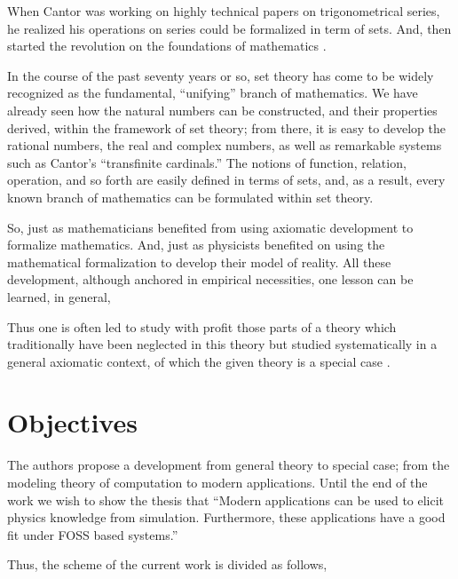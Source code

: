 \documentclass[
12pt,				%
openright,			%
oneside,			%
a4paper,			%
brazil,				%
english,			  %
]{abntex2}
\begin{document}
When Cantor was working on highly technical papers on trigonometrical
series, he realized his operations on series could be formalized in
term of sets. And, then started the revolution on the foundations of mathematics \cite{pinter2014book}.

\begin{citacao}
In the course of the past seventy years or so, set theory has come to be
widely recognized as the fundamental, “unifying” branch of mathematics. We
have already seen how the natural numbers can be constructed, and
their properties derived, within the framework of set theory; from
there, it is easy to develop the rational numbers, the real and
complex numbers, as well as remarkable systems such as Cantor’s
“transfinite cardinals.” The notions of function, relation, operation,
and so forth are easily defined in terms of sets, and, as a result,
every known branch of mathematics can be formulated within set
theory. \cite{pinter2014book}
\end{citacao}

So, just as mathematicians benefited from using axiomatic
development to formalize mathematics. And, just as physicists
benefited on using the mathematical formalization to develop their
model of reality. All these development, although anchored in
empirical necessities, one lesson can be learned, in general,

\begin{citacao}
  Thus one is often led to study with profit those parts of a
  theory which traditionally have been neglected in this theory but studied
  systematically in a general axiomatic context, of which the given theory
  is a special case \cite{bourbaki2004theory}.
\end{citacao}

\section{Objectives}


The authors propose a development from general theory to special case;
from the modeling theory of computation to modern applications. Until the
end of the work we wish to show the thesis that ``Modern applications
can be used to elicit physics knowledge from simulation. Furthermore,
these applications have a good fit under FOSS based systems.''

Thus, the scheme of the current work is divided as follows,

\end{document}
